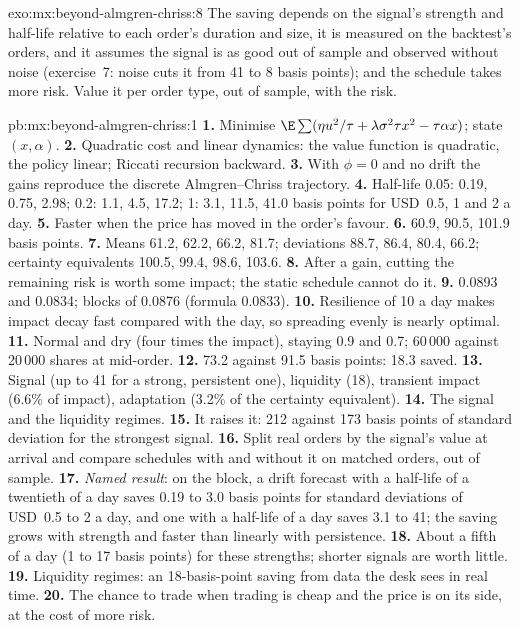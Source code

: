 \begin{solution}{exo:mx:beyond-almgren-chriss:8}
The saving depends on the signal's strength and half-life relative to each order's duration and size, it is measured on the backtest's orders, and it
assumes the signal is as good out of sample and observed without noise (exercise~7: noise cuts it from 41 to 8 basis points); and the schedule takes more
risk. Value it per order type, out of sample, with the risk.
\end{solution}

\begin{solution}{pb:mx:beyond-almgren-chriss:1}
\textbf{1.} Minimise $\E\sum(\eta u^2/\tau+\lambda\sigma^2\tau x^2-\tau\alpha x)$; state $(x,\alpha)$.
\textbf{2.} Quadratic cost and linear dynamics: the value function is quadratic, the policy linear; Riccati recursion backward.
\textbf{3.} With $\phi=0$ and no drift the gains reproduce the discrete Almgren--Chriss trajectory.
\textbf{4.} Half-life 0.05: 0.19, 0.75, 2.98; 0.2: 1.1, 4.5, 17.2; 1: 3.1, 11.5, 41.0 basis points for USD~0.5, 1 and 2 a day.
\textbf{5.} Faster when the price has moved in the order's favour.
\textbf{6.} 60.9, 90.5, 101.9 basis points.
\textbf{7.} Means 61.2, 62.2, 66.2, 81.7; deviations 88.7, 86.4, 80.4, 66.2; certainty equivalents 100.5, 99.4, 98.6, 103.6.
\textbf{8.} After a gain, cutting the remaining risk is worth some impact; the static schedule cannot do it.
\textbf{9.} 0.0893 and 0.0834; blocks of 0.0876 (formula 0.0833).
\textbf{10.} Resilience of 10 a day makes impact decay fast compared with the day, so spreading evenly is nearly optimal.
\textbf{11.} Normal and dry (four times the impact), staying 0.9 and 0.7; 60\,000 against 20\,000 shares at mid-order.
\textbf{12.} 73.2 against 91.5 basis points: 18.3 saved.
\textbf{13.} Signal (up to 41 for a strong, persistent one), liquidity (18), transient impact (6.6\% of impact), adaptation (3.2\% of the certainty equivalent).
\textbf{14.} The signal and the liquidity regimes.
\textbf{15.} It raises it: 212 against 173 basis points of standard deviation for the strongest signal.
\textbf{16.} Split real orders by the signal's value at arrival and compare schedules with and without it on matched orders, out of sample.
\textbf{17.} \emph{Named result}: on the block, a drift forecast with a half-life of a twentieth of a day saves 0.19 to 3.0 basis points for standard deviations of
USD~0.5 to 2 a day, and one with a half-life of a day saves 3.1 to 41; the saving grows with strength and faster than linearly with persistence.
\textbf{18.} About a fifth of a day (1 to 17 basis points) for these strengths; shorter signals are worth little.
\textbf{19.} Liquidity regimes: an 18-basis-point saving from data the desk sees in real time.
\textbf{20.} The chance to trade when trading is cheap and the price is on its side, at the cost of more risk.
\end{solution}

